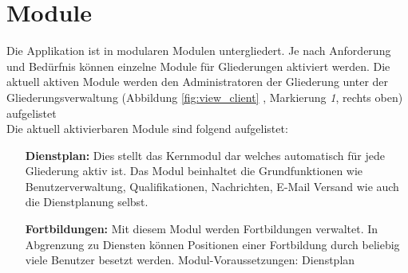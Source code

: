 \chapter{Module}
\label{cha:module}
Die Applikation ist in modularen Modulen untergliedert. Je nach Anforderung und Bedürfnis können einzelne Module für Gliederungen aktiviert werden.
Die aktuell aktiven Module werden den Administratoren der Gliederung unter der Gliederungsverwaltung \noindent (Abbildung \ref{fig:view_client} \textit{}, Markierung \textit{1}, rechts oben) aufgelistet\\

\noindent Die aktuell aktivierbaren Module sind folgend aufgelistet:

\begin{itemize}
	\item[\textbf{Dienstplan:}] Dies stellt das Kernmodul dar welches automatisch für jede Gliederung aktiv ist. Das Modul beinhaltet die Grundfunktionen wie Benutzerverwaltung, Qualifikationen, Nachrichten, E-Mail Versand wie auch die Dienstplanung selbst.

	\item[\textbf{Fortbildungen:}] Mit diesem Modul werden Fortbildungen verwaltet. 
	In Abgrenzung zu Diensten können Positionen einer Fortbildung durch beliebig viele Benutzer besetzt werden. 
	Modul-Voraussetzungen: Dienstplan
	
\end{itemize}
